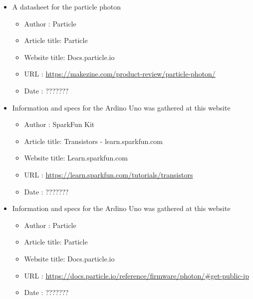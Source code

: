 \documentclass{article}
\begin{document}
\begin{thebibliography}{56}
\begin{itemize}
        \item A datasheet for the particle photon
        \begin{itemize}
            \item Author       : Particle
            \item Article title: Particle
            \item Website title: Docs.particle.io
            \item URL          : \url{https://makezine.com/product-review/particle-photon/}
            \item Date         : ???????
        \end{itemize}
    \end{itemize}

    \begin{itemize}
        \item Information and specs for the Ardino Uno was gathered at this website
        \begin{itemize}
            \item Author       : SparkFun Kit
            \item Article title: Transistors - learn.sparkfun.com
            \item Website title: Learn.sparkfun.com
            \item URL          : \url{https://learn.sparkfun.com/tutorials/transistors}
            \item Date         : ???????
        \end{itemize}
    \end{itemize}

    \begin{itemize}
        \item Information and specs for the Ardino Uno was gathered at this website
        \begin{itemize}
            \item Author       : Particle
            \item Article title: Particle
            \item Website title: Docs.particle.io
            \item URL          : \url{https://docs.particle.io/reference/firmware/photon/#get-public-ip}
            \item Date         : ???????
        \end{itemize}
    \end{itemize}


\end{thebibliography}
\end{document}
